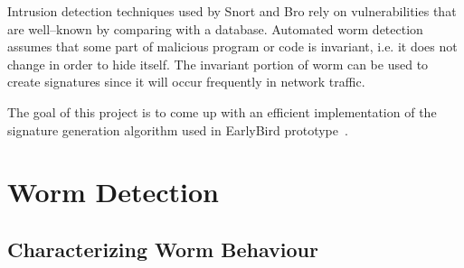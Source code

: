 \documentclass{report}
\begin{document}
Intrusion detection techniques used by Snort and Bro rely on vulnerabilities that are well--known by comparing with a database. Automated worm detection assumes that some part of malicious program or code is invariant, i.e. it does not change in order to hide itself. The invariant portion of worm can be used to create signatures since it will occur frequently in network traffic.

The goal of this project is to come up with an efficient implementation of the signature generation algorithm used in EarlyBird prototype~\cite{DBLP:conf/osdi/SinghEVS04}.

\chapter{Worm Detection}
\section{Characterizing Worm Behaviour}



\nocite{*}

\end{document}
